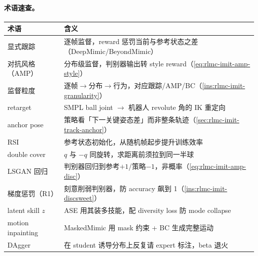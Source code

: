 \paragraph{术语速查。}
\begin{center}
\small
\begin{tabular}{@{}ll@{}}
\toprule
术语 & 含义 \\
\midrule
显式跟踪 & 逐帧监督，reward 惩罚当前与参考状态之差（DeepMimic/BeyondMimic） \\
对抗风格（AMP） & 分布级监督，判别器输出转 style reward（\cref{eq:rlmc-imit-amp-style}） \\
监督粒度 & 逐帧$\to$分布$\to$行为，对应跟踪/AMP/BC（\cref{ins:rlmc-imit-granularity}） \\
retarget & SMPL ball joint $\to$ 机器人 revolute 角的 IK 重定向 \\
anchor pose & 策略看「下一关键姿态差」而非整条轨迹（\cref{sec:rlmc-imit-track-anchor}） \\
RSI & 参考状态初始化，从随机帧起步提升训练效率 \\
double cover & $q$ 与 $-q$ 同旋转，求距离前须拉到同一半球 \\
LSGAN 回归 & 判别器回归到参考$+1$/策略$-1$，非概率（\cref{eq:rlmc-imit-amp-disc}） \\
梯度惩罚（R1） & 刻意削弱判别器，防 accuracy 飙到 1（\cref{ins:rlmc-imit-discsweet}） \\
latent skill $z$ & ASE 用其装多技能，配 diversity loss 防 mode collapse \\
motion inpainting & MaskedMimic 用 mask 约束 + BC 生成完整运动 \\
DAgger & 在 student 诱导分布上反复请 expert 标注，beta 退火 \\
\bottomrule
\end{tabular}
\end{center}

